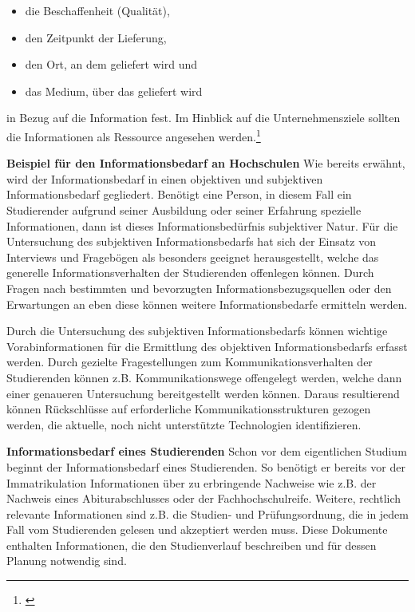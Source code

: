 \begin{itemize}
	\item die Beschaffenheit (Qualität),
	\item den Zeitpunkt der Lieferung,
	\item den Ort, an dem geliefert wird und
	\item das Medium, über das geliefert wird		 
\end{itemize}
in Bezug auf die Information fest. Im Hinblick auf die Unternehmensziele sollten die Informationen als Ressource angesehen werden.\footnote{\cite{bode_informationsbegriff_1997}} 

\textbf{Beispiel für den Informationsbedarf an Hochschulen}
Wie bereits erwähnt, wird der Informationsbedarf in einen objektiven und subjektiven Informationsbedarf gegliedert. Benötigt eine Person, in diesem Fall ein Studierender aufgrund seiner Ausbildung oder seiner Erfahrung spezielle Informationen, dann ist dieses Informationsbedürfnis subjektiver Natur. 
Für die Untersuchung des subjektiven Informationsbedarfs hat sich der Einsatz von Interviews und Fragebögen als besonders geeignet herausgestellt, welche das generelle Informationsverhalten der Studierenden offenlegen können. Durch Fragen nach bestimmten und bevorzugten Informationsbezugsquellen oder den Erwartungen an eben diese können weitere Informationsbedarfe ermitteln werden.

Durch die Untersuchung des subjektiven Informationsbedarfs können wichtige Vorabinformationen für die Ermittlung des objektiven Informationsbedarfs erfasst werden. Durch gezielte Fragestellungen zum Kommunikationsverhalten der Studierenden können z.B. Kommunikationswege offengelegt werden, welche dann einer genaueren Untersuchung bereitgestellt werden können. Daraus resultierend können Rückschlüsse auf erforderliche Kommunikationsstrukturen gezogen werden, die aktuelle, noch nicht unterstützte Technologien identifizieren. 

\textbf{Informationsbedarf eines Studierenden}
Schon vor dem eigentlichen Studium beginnt der Informationsbedarf  eines Studierenden. So benötigt er bereits vor der Immatrikulation Informationen über zu erbringende Nachweise wie z.B. der Nachweis eines Abiturabschlusses oder der Fachhochschulreife. Weitere, rechtlich relevante Informationen sind z.B. die Studien- und Prüfungsordnung, die in jedem Fall vom Studierenden gelesen und akzeptiert werden muss. Diese Dokumente enthalten Informationen, die den Studienverlauf beschreiben und für dessen Planung notwendig sind.

